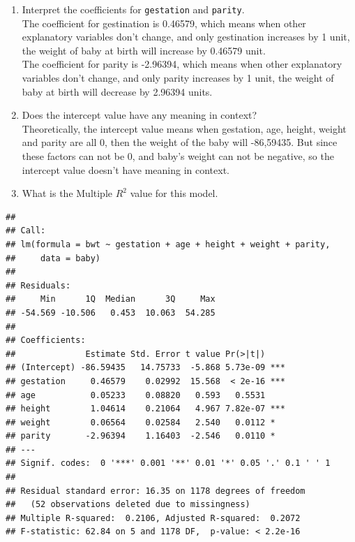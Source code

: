 \documentclass[]{article}
\newenvironment{Shaded}{\begin{snugshade}}{\end{snugshade}}
\newcommand{\KeywordTok}[1]{\textcolor[rgb]{0.13,0.29,0.53}{\textbf{#1}}}
\newcommand{\NormalTok}[1]{#1}
\newcommand{\OperatorTok}[1]{\textcolor[rgb]{0.81,0.36,0.00}{\textbf{#1}}}
\newcommand{\StringTok}[1]{\textcolor[rgb]{0.31,0.60,0.02}{#1}}
\begin{document}
\begin{enumerate}
\def\labelenumi{\arabic{enumi}.}
\setcounter{enumi}{2}
\item
  Interpret the coefficients for \texttt{gestation} and
  \texttt{parity}.\\
  The coefficient for gestination is 0.46579, which means when other
  explanatory variables don't change, and only gestination increases by
  1 unit, the weight of baby at birth will increase by 0.46579 unit.\\
  The coefficient for parity is -2.96394, which means when other
  explanatory variables don't change, and only parity increases by 1
  unit, the weight of baby at birth will decrease by 2.96394 units.
\item
  Does the intercept value have any meaning in context?\\
  Theoretically, the intercept value means when gestation, age, height,
  weight and parity are all 0, then the weight of the baby will
  -86,59435. But since these factors can not be 0, and baby's weight can
  not be negative, so the intercept value doesn't have meaning in
  context.
\item
  What is the Multiple \(R^2\) value for this model.
\end{enumerate}

\begin{Shaded}
\end{Shaded}

\begin{verbatim}
## 
## Call:
## lm(formula = bwt ~ gestation + age + height + weight + parity, 
##     data = baby)
## 
## Residuals:
##     Min      1Q  Median      3Q     Max 
## -54.569 -10.506   0.453  10.063  54.285 
## 
## Coefficients:
##              Estimate Std. Error t value Pr(>|t|)    
## (Intercept) -86.59435   14.75733  -5.868 5.73e-09 ***
## gestation     0.46579    0.02992  15.568  < 2e-16 ***
## age           0.05233    0.08820   0.593   0.5531    
## height        1.04614    0.21064   4.967 7.82e-07 ***
## weight        0.06564    0.02584   2.540   0.0112 *  
## parity       -2.96394    1.16403  -2.546   0.0110 *  
## ---
## Signif. codes:  0 '***' 0.001 '**' 0.01 '*' 0.05 '.' 0.1 ' ' 1
## 
## Residual standard error: 16.35 on 1178 degrees of freedom
##   (52 observations deleted due to missingness)
## Multiple R-squared:  0.2106, Adjusted R-squared:  0.2072 
## F-statistic: 62.84 on 5 and 1178 DF,  p-value: < 2.2e-16
\end{verbatim}
\end{document}
